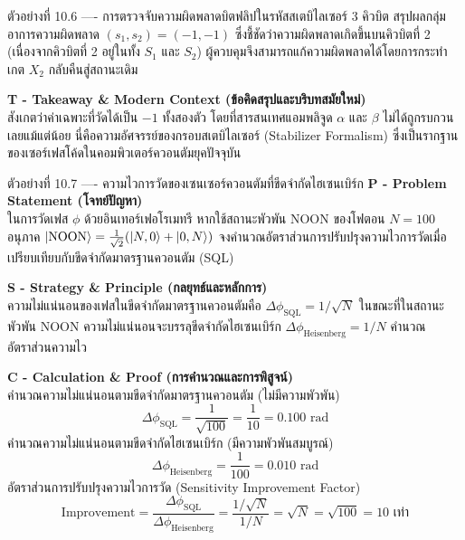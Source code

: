 \begin{psctbox}{ตัวอย่างที่ 10.6 ---- การตรวจจับความผิดพลาดบิตฟลิปในรหัสสเตบิไลเซอร์ 3 คิวบิต}
สรุปผลกลุ่มอาการความผิดพลาด $(s_1, s_2) = (-1, -1)$ ซึ่งชี้ชัดว่าความผิดพลาดเกิดขึ้นบนคิวบิตที่ 2 (เนื่องจากคิวบิตที่ 2 อยู่ในทั้ง $S_1$ และ $S_2$) ผู้ควบคุมจึงสามารถแก้ความผิดพลาดได้โดยการกระทำเกต $X_2$ กลับคืนสู่สถานะเดิม

\vspace{4pt}
\noindent\textbf{T - Takeaway \& Modern Context (ข้อคิดสรุปและบริบทสมัยใหม่)} \\
สังเกตว่าค่าเฉพาะที่วัดได้เป็น $-1$ ทั้งสองตัว โดยที่สารสนเทศแอมพลิจูด $\alpha$ และ $\beta$ ไม่ได้ถูกรบกวนเลยแม้แต่น้อย นี่คือความอัศจรรย์ของกรอบสเตบิไลเซอร์ (Stabilizer Formalism) ซึ่งเป็นรากฐานของเซอร์เฟสโค้ดในคอมพิวเตอร์ควอนตัมยุคปัจจุบัน
\end{psctbox}

\begin{psctbox}{ตัวอย่างที่ 10.7 ---- ความไวการวัดของเซนเซอร์ควอนตัมที่ขีดจำกัดไฮเซนเบิร์ก}
\noindent\textbf{P - Problem Statement (โจทย์ปัญหา)} \\
ในการวัดเฟส $\phi$ ด้วยอินเทอร์เฟอโรเมทรี หากใช้สถานะพัวพัน NOON ของโฟตอน $N = 100$ อนุภาค $\ket{\text{NOON}} = \frac{1}{\sqrt{2}}(\ket{N, 0} + \ket{0, N})$ จงคำนวณอัตราส่วนการปรับปรุงความไวการวัดเมื่อเปรียบเทียบกับขีดจำกัดมาตรฐานควอนตัม (SQL)

\vspace{4pt}
\noindent\textbf{S - Strategy \& Principle (กลยุทธ์และหลักการ)} \\
ความไม่แน่นอนของเฟสในขีดจำกัดมาตรฐานควอนตัมคือ $\Delta \phi_{\text{SQL}} = 1/\sqrt{N}$ ในขณะที่ในสถานะพัวพัน NOON ความไม่แน่นอนจะบรรลุขีดจำกัดไฮเซนเบิร์ก $\Delta \phi_{\text{Heisenberg}} = 1/N$ คำนวณอัตราส่วนความไว

\vspace{4pt}
\noindent\textbf{C - Calculation \& Proof (การคำนวณและการพิสูจน์)} \\
คำนวณความไม่แน่นอนตามขีดจำกัดมาตรฐานควอนตัม (ไม่มีความพัวพัน)
\begin{equation}
\Delta \phi_{\text{SQL}} = \frac{1}{\sqrt{100}} = \frac{1}{10} = 0.100\text{ rad}
\end{equation}
คำนวณความไม่แน่นอนตามขีดจำกัดไฮเซนเบิร์ก (มีความพัวพันสมบูรณ์)
\begin{equation}
\Delta \phi_{\text{Heisenberg}} = \frac{1}{100} = 0.010\text{ rad}
\end{equation}
อัตราส่วนการปรับปรุงความไวการวัด (Sensitivity Improvement Factor)
\begin{equation}
\text{Improvement} = \frac{\Delta \phi_{\text{SQL}}}{\Delta \phi_{\text{Heisenberg}}} = \frac{1/\sqrt{N}}{1/N} = \sqrt{N} = \sqrt{100} = 10\text{ เท่า}
\end{equation}


\end{psctbox}
